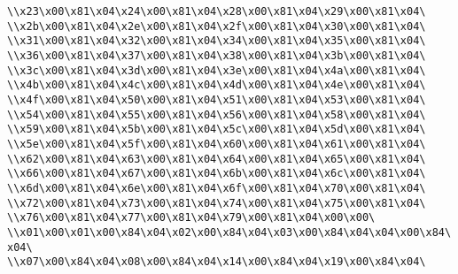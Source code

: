 \verb|\\x23\x00\x81\x04\x24\x00\x81\x04\x28\x00\x81\x04\x29\x00\x81\x04\|\newline
\verb|\\x2b\x00\x81\x04\x2e\x00\x81\x04\x2f\x00\x81\x04\x30\x00\x81\x04\|\newline
\verb|\\x31\x00\x81\x04\x32\x00\x81\x04\x34\x00\x81\x04\x35\x00\x81\x04\|\newline
\verb|\\x36\x00\x81\x04\x37\x00\x81\x04\x38\x00\x81\x04\x3b\x00\x81\x04\|\newline
\verb|\\x3c\x00\x81\x04\x3d\x00\x81\x04\x3e\x00\x81\x04\x4a\x00\x81\x04\|\newline
\verb|\\x4b\x00\x81\x04\x4c\x00\x81\x04\x4d\x00\x81\x04\x4e\x00\x81\x04\|\newline
\verb|\\x4f\x00\x81\x04\x50\x00\x81\x04\x51\x00\x81\x04\x53\x00\x81\x04\|\newline
\verb|\\x54\x00\x81\x04\x55\x00\x81\x04\x56\x00\x81\x04\x58\x00\x81\x04\|\newline
\verb|\\x59\x00\x81\x04\x5b\x00\x81\x04\x5c\x00\x81\x04\x5d\x00\x81\x04\|\newline
\verb|\\x5e\x00\x81\x04\x5f\x00\x81\x04\x60\x00\x81\x04\x61\x00\x81\x04\|\newline
\verb|\\x62\x00\x81\x04\x63\x00\x81\x04\x64\x00\x81\x04\x65\x00\x81\x04\|\newline
\verb|\\x66\x00\x81\x04\x67\x00\x81\x04\x6b\x00\x81\x04\x6c\x00\x81\x04\|\newline
\verb|\\x6d\x00\x81\x04\x6e\x00\x81\x04\x6f\x00\x81\x04\x70\x00\x81\x04\|\newline
\verb|\\x72\x00\x81\x04\x73\x00\x81\x04\x74\x00\x81\x04\x75\x00\x81\x04\|\newline
\verb|\\x76\x00\x81\x04\x77\x00\x81\x04\x79\x00\x81\x04\x00\x00\|\newline
\verb|\\x01\x00\x01\x00\x84\x04\x02\x00\x84\x04\x03\x00\x84\x04\x04\x00\x84\x04\|\newline
\verb|\\x07\x00\x84\x04\x08\x00\x84\x04\x14\x00\x84\x04\x19\x00\x84\x04\|\newline
